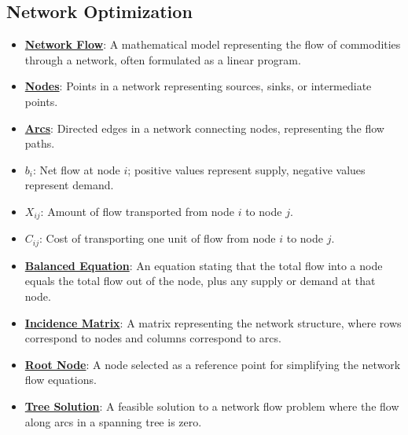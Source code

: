 \documentclass{article}%
\begin{document}
\subsection{Network Optimization}%
\label{subsec:NetworkOptimization}%
\begin{itemize}[leftmargin=*]%
\item \href{https://www.math.purdue.edu/~yipn/421/2024-11-05-NetFlows.pdf#page=1}{\textbf{Network Flow}}: A mathematical model representing the flow of commodities through a network, often formulated as a linear program.%
\item \href{https://www.math.purdue.edu/~yipn/421/2024-11-05-NetFlows.pdf#page=1}{\textbf{Nodes}}: Points in a network representing sources, sinks, or intermediate points.%
\item \href{https://www.math.purdue.edu/~yipn/421/2024-11-05-NetFlows.pdf#page=1}{\textbf{Arcs}}: Directed edges in a network connecting nodes, representing the flow paths.%
\item \href{https://www.math.purdue.edu/~yipn/421/2024-11-05-NetFlows.pdf#page=2}{\textbf{$b_i$}}: Net flow at node $i$; positive values represent supply, negative values represent demand.%
\item \href{https://www.math.purdue.edu/~yipn/421/2024-11-05-NetFlows.pdf#page=2}{\textbf{$X_{ij}$}}: Amount of flow transported from node $i$ to node $j$.%
\item \href{https://www.math.purdue.edu/~yipn/421/2024-11-05-NetFlows.pdf#page=2}{\textbf{$C_{ij}$}}: Cost of transporting one unit of flow from node $i$ to node $j$.%
\item \href{https://www.math.purdue.edu/~yipn/421/2024-11-05-NetFlows.pdf#page=3}{\textbf{Balanced Equation}}: An equation stating that the total flow into a node equals the total flow out of the node, plus any supply or demand at that node.%
\item \href{https://www.math.purdue.edu/~yipn/421/2024-11-05-NetFlows.pdf#page=4}{\textbf{Incidence Matrix}}: A matrix representing the network structure, where rows correspond to nodes and columns correspond to arcs.%
\item \href{https://www.math.purdue.edu/~yipn/421/2024-11-05-NetFlows.pdf#page=6}{\textbf{Root Node}}: A node selected as a reference point for simplifying the network flow equations.%
\item \href{https://www.math.purdue.edu/~yipn/421/2024-11-05-NetFlows.pdf#page=11}{\textbf{Tree Solution}}: A feasible solution to a network flow problem where the flow along arcs in a spanning tree is zero.%

\end{itemize}
\end{document}
